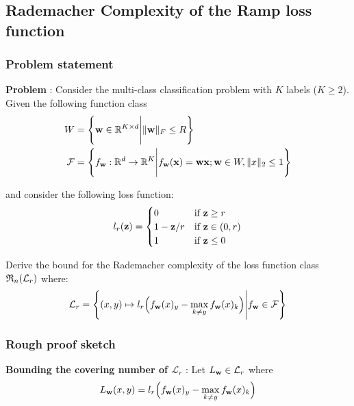 \newpage
\subsection{Rademacher Complexity of the Ramp loss function}

\subsubsection{Problem statement}
\textbf{Problem} : Consider the multi-class classification problem with $K$ labels ($K\ge2$). Given the following function class
\begin{align*}
    W  &= \Bigg\{ 
        {\bf w}\in \mathbb{R}^{K\times d} \Bigg| \|{\bf w}\|_F \le R
     \Bigg\} \\
    \mathcal{F} &= \Bigg\{ 
        f_{{\bf w}}:\mathbb{R}^d \to \mathbb{R}^{K} \Bigg| f_{\bf w}({\bf x}) = {\bf wx}; {\bf w}\in W, \|x\|_2\le 1
     \Bigg\}
\end{align*}

\noindent and consider the following loss function:
\begin{align*}
    l_r({\bf z}) &= \begin{cases}
        0 & \text{if } {\bf z} \ge r \\
        1 - {\bf z}/r &\text{if } {\bf z} \in (0,r) \\ 
        1 &\text{if } {\bf z} \le 0
    \end{cases} \\
\end{align*}

\noindent Derive the bound for the Rademacher complexity of the loss function class $\mathfrak{R}_n(\mathcal{L}_r)$ where:
\begin{align*}
    \mathcal{L}_r = \Bigg\{ 
        (x, y)\mapsto l_r\Big(  f_{\bf w}(x)_y - \max_{k\ne y} f_{\bf w}(x)_k  \Big) \Bigg| f_{{\bf w}} \in \mathcal{F} 
     \Bigg\}
\end{align*}

\subsubsection{Rough proof sketch}
\textbf{Bounding the covering number of $\mathcal{L}_r$} : Let $L_{\bf w} \in \mathcal{L}_r$ where
\begin{align*}
    L_{\bf w}(x,y) =  l_r\Big(  f_{\bf w}(x)_y - \max_{k\ne y} f_{\bf w}(x)_k  \Big)
\end{align*}


